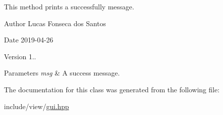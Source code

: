 This method prints a successfully message. \begin{DoxyAuthor}{Author}
Lucas Fonseca dos Santos 
\end{DoxyAuthor}
\begin{DoxyDate}{Date}
2019-\/04-\/26 
\end{DoxyDate}
\begin{DoxyVersion}{Version}
1..
\end{DoxyVersion}

\begin{DoxyParams}{Parameters}
{\em msg} & A success message. \\
\hline
\end{DoxyParams}


The documentation for this class was generated from the following file\+:\begin{DoxyCompactItemize}
\item 
include/view/\mbox{\hyperlink{gui_8hpp}{gui.\+hpp}}\end{DoxyCompactItemize}
